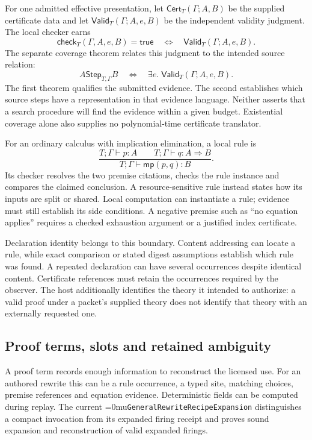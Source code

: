 \documentclass[11pt,a4paper]{article}
\newcommand{\name}[1]{\textup{\Urlmuskip=0mu\relax\nolinkurl{#1}}}
\begin{document}
For one admitted effective presentation, let
$\mathsf{Cert}_T(\Gamma;A,B)$ be the supplied certificate data and let
$\mathsf{Valid}_T(\Gamma;A,e,B)$ be the independent validity judgment. The
local checker earns
\[
 \mathsf{check}_T(\Gamma,A,e,B)=\mathsf{true}
 \quad\Longleftrightarrow\quad
 \mathsf{Valid}_T(\Gamma;A,e,B).
\]
The separate coverage theorem relates this judgment to the intended source
relation:
\[
 A\mathrel{\mathsf{Step}_{T,\Gamma}}B
 \quad\Longleftrightarrow\quad
 \exists e.\;\mathsf{Valid}_T(\Gamma;A,e,B).
\]
The first theorem qualifies the submitted evidence. The second establishes
which source steps have a representation in that evidence language. Neither
asserts that a search procedure will find the evidence within a given budget.
Existential coverage alone also supplies no polynomial-time certificate
translator.

For an ordinary calculus with implication elimination, a local rule is
\[
 \frac{T;\Gamma\vdash p:A\qquad T;\Gamma\vdash q:A\Rightarrow B}
      {T;\Gamma\vdash\mathsf{mp}(p,q):B}.
\]
Its checker resolves the two premise citations, checks the rule instance and
compares the claimed conclusion. A resource-sensitive rule instead states how
its inputs are split or shared. Local computation can instantiate a rule;
evidence must still establish its side conditions. A negative premise such as
``no equation applies'' requires a checked exhaustion argument or a justified
index certificate.

Declaration identity belongs to this boundary. Content addressing can locate
a rule, while exact comparison or stated digest assumptions establish which
rule was found. A repeated declaration can have several occurrences despite
identical content. Certificate references must retain the occurrences required
by the observer. The host additionally identifies the theory it intended to
authorize: a valid proof under a packet's supplied theory does not identify
that theory with an externally requested one.

\subsection{Proof terms, slots and retained ambiguity}

A proof term records enough information to reconstruct the licensed use.
For an authored rewrite this can be a rule occurrence, a typed site, matching
choices, premise references and equation evidence. Deterministic fields can be
computed during replay. The current \name{GeneralRewriteRecipeExpansion}
distinguishes a compact invocation from its expanded firing receipt and proves
sound expansion and reconstruction of valid expanded firings.
\end{document}
